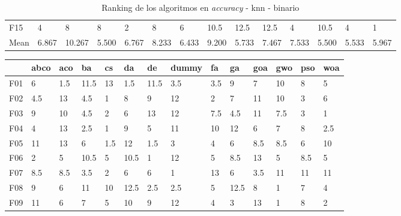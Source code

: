 \begin{table}
\begin{adjustbox}{width=\linewidth}
\begin{tabular}{llllllllllllll}
            F15  & 4     & 8      & 8     & 2     & 8     & 6     & 10.5  & 12.5  & 12.5  & 4     & 10.5  & 4     & 1     \\
            Mean & 6.867 & 10.267 & 5.500 & 6.767 & 8.233 & 6.433 & 9.200 & 5.733 & 7.467 & 7.533 & 5.500 & 5.533 & 5.967 \\
            \bottomrule
        \end{tabular}
    \end{adjustbox}
    \caption{Ranking de los algoritmos en \textit{accuracy} - knn - binario}
    \label{tab:ranking_accuracy_bin_knn}
\end{table}

\begin{table}
    \centering
    \begin{adjustbox}{width=\linewidth}
        \begin{tabular}{llllllllllllll}
            \toprule
            {}   & abco  & aco   & ba    & cs    & da    & de    & dummy & fa    & ga    & goa   & gwo   & pso   & woa   \\
            \midrule
            F01  & 6     & 1.5   & 11.5  & 13    & 1.5   & 11.5  & 3.5   & 3.5   & 9     & 7     & 10    & 8     & 5     \\
            F02  & 4.5   & 13    & 4.5   & 1     & 8     & 9     & 12    & 2     & 7     & 11    & 10    & 3     & 6     \\
            F03  & 9     & 10    & 4.5   & 2     & 6     & 13    & 12    & 7.5   & 4.5   & 11    & 7.5   & 3     & 1     \\
            F04  & 4     & 13    & 2.5   & 1     & 9     & 5     & 11    & 10    & 12    & 6     & 7     & 8     & 2.5   \\
            F05  & 11    & 13    & 6     & 1.5   & 12    & 1.5   & 3     & 4     & 6     & 8.5   & 8.5   & 6     & 10    \\
            F06  & 2     & 5     & 10.5  & 5     & 10.5  & 1     & 12    & 5     & 8.5   & 13    & 5     & 8.5   & 5     \\
            F07  & 8.5   & 8.5   & 3.5   & 2     & 6     & 6     & 1     & 13    & 6     & 3.5   & 11    & 11    & 11    \\
            F08  & 9     & 6     & 11    & 10    & 12.5  & 2.5   & 2.5   & 5     & 12.5  & 8     & 1     & 7     & 4     \\
            F09  & 11    & 6     & 7     & 5     & 10    & 9     & 12    & 4     & 3     & 13    & 1     & 8     & 2     \\

\end{tabular}
\end{adjustbox}
\end{table}
